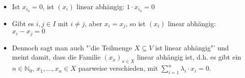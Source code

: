 \begin{remark}
	\begin{itemize}
		\item Ist $x_{i_0}=0$, ist $(x_i)$ linear abhängig: $1\cdot x_{i_0}=0$
		\item Gibt es $i,j\in I$ mit $i\neq j$, aber $x_i=x_j$, so ist $(x_i)$ linear abhängig: $x_i-x_j=0$
		\item Dennoch sagt man auch "'die Teilmenge $X\subseteq V$ ist linear abhängig"' und meint damit, dass die Familie $(x_x)
		_{x\in X}$ linear abhängig ist, d.h. es gibt ein $n\in \mathbb N_0$, $x_1,...,x_n \in X$ paarweise verschieden, mit 
		$\sum_{i=1}^n \lambda_i\cdot x_i=0$.
	\end{itemize}
\end{remark}
